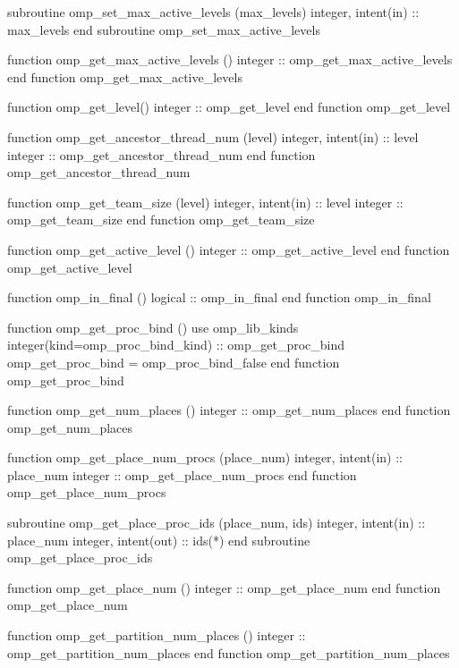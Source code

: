 {{\begin{codepar}
          subroutine omp\_set\_max\_active\_levels (max\_levels)
           integer, intent(in) :: max\_levels
          end subroutine omp\_set\_max\_active\_levels

          function omp\_get\_max\_active\_levels ()
           integer :: omp\_get\_max\_active\_levels
          end function omp\_get\_max\_active\_levels

          function omp\_get\_level()
           integer :: omp\_get\_level
          end function omp\_get\_level

          function omp\_get\_ancestor\_thread\_num (level)
           integer, intent(in) :: level
           integer :: omp\_get\_ancestor\_thread\_num
          end function omp\_get\_ancestor\_thread\_num

          function omp\_get\_team\_size (level)
           integer, intent(in) :: level
           integer :: omp\_get\_team\_size
          end function omp\_get\_team\_size

          function omp\_get\_active\_level ()
           integer :: omp\_get\_active\_level
          end function omp\_get\_active\_level

          function omp\_in\_final ()
           logical :: omp\_in\_final
          end function omp\_in\_final

          function omp\_get\_proc\_bind ()
           use omp\_lib\_kinds
           integer(kind=omp\_proc\_bind\_kind) :: omp\_get\_proc\_bind
           omp\_get\_proc\_bind = omp\_proc\_bind\_false
          end function omp\_get\_proc\_bind

          function omp\_get\_num\_places ()
          integer :: omp\_get\_num\_places
          end function omp\_get\_num\_places

          function omp\_get\_place\_num\_procs (place\_num)
          integer, intent(in) :: place\_num
          integer :: omp\_get\_place\_num\_procs
          end function omp\_get\_place\_num\_procs

          subroutine omp\_get\_place\_proc\_ids (place\_num, ids)
          integer, intent(in) :: place\_num
          integer, intent(out) :: ids(*)
          end subroutine omp\_get\_place\_proc\_ids

          function omp\_get\_place\_num ()
          integer :: omp\_get\_place\_num
          end function omp\_get\_place\_num

          function omp\_get\_partition\_num\_places ()
          integer :: omp\_get\_partition\_num\_places
          end function omp\_get\_partition\_num\_places


\end{codepar}}}

